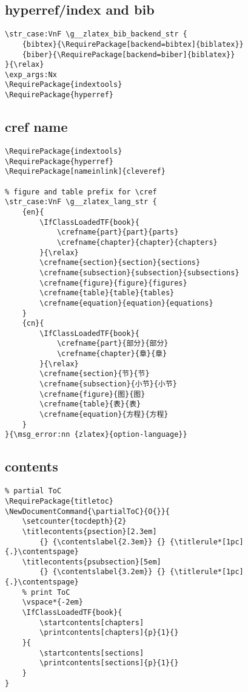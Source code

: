 \subsection{hyperref/index and bib}
\begin{verbatim}
\str_case:VnF \g__zlatex_bib_backend_str {
    {bibtex}{\RequirePackage[backend=bibtex]{biblatex}}
    {biber}{\RequirePackage[backend=biber]{biblatex}}
}{\relax}
\exp_args:Nx 
\RequirePackage{indextools}
\RequirePackage{hyperref}
\end{verbatim}

\subsection{cref name}
\begin{verbatim}
\RequirePackage{indextools}
\RequirePackage{hyperref}
\RequirePackage[nameinlink]{cleveref}

% figure and table prefix for \cref 
\str_case:VnF \g__zlatex_lang_str {
    {en}{
        \IfClassLoadedTF{book}{
            \crefname{part}{part}{parts}
            \crefname{chapter}{chapter}{chapters}
        }{\relax}
        \crefname{section}{section}{sections}
        \crefname{subsection}{subsection}{subsections}
        \crefname{figure}{figure}{figures}
        \crefname{table}{table}{tables}
        \crefname{equation}{equation}{equations}
    }
    {cn}{
        \IfClassLoadedTF{book}{
            \crefname{part}{部分}{部分}
            \crefname{chapter}{章}{章}
        }{\relax}
        \crefname{section}{节}{节}
        \crefname{subsection}{小节}{小节}
        \crefname{figure}{图}{图}
        \crefname{table}{表}{表}
        \crefname{equation}{方程}{方程}
    }
}{\msg_error:nn {zlatex}{option-language}}    
\end{verbatim}

\subsection{contents}
\begin{verbatim}
% partial ToC
\RequirePackage{titletoc}
\NewDocumentCommand{\partialToC}{O{}}{
    \setcounter{tocdepth}{2}  
    \titlecontents{psection}[2.3em]
        {} {\contentslabel{2.3em}} {} {\titlerule*[1pc]{.}\contentspage}
    \titlecontents{psubsection}[5em]
        {} {\contentslabel{3.2em}} {} {\titlerule*[1pc]{.}\contentspage}
    % print ToC
    \vspace*{-2em}
    \IfClassLoadedTF{book}{
        \startcontents[chapters]
        \printcontents[chapters]{p}{1}{}
    }{
        \startcontents[sections]
        \printcontents[sections]{p}{1}{}
    }
}
\end{verbatim}

